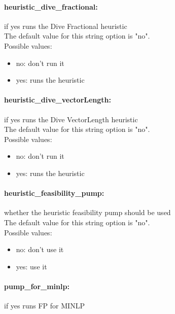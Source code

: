\paragraph{\bf heuristic\_dive\_fractional:}\label{sec:heuristic_dive_fractional} if yes runs the Dive Fractional heuristic $\;$ \\

The default value for this string option is "no".
\\ 
Possible values:
\begin{itemize}
   \item no: don't run it
   \item yes: runs the heuristic
\end{itemize}

\paragraph{\bf heuristic\_dive\_vectorLength:}\label{sec:heuristic_dive_vectorLength} if yes runs the Dive VectorLength heuristic $\;$ \\

The default value for this string option is "no".
\\ 
Possible values:
\begin{itemize}
   \item no: don't run it
   \item yes: runs the heuristic
\end{itemize}

\paragraph{\bf heuristic\_feasibility\_pump:}\label{sec:heuristic_feasibility_pump} whether the heuristic feasibility pump should be used $\;$ \\

The default value for this string option is "no".
\\ 
Possible values:
\begin{itemize}
   \item no: don't use it
   \item yes: use it
\end{itemize}

\paragraph{\bf pump\_for\_minlp:}\label{sec:pump_for_minlp} if yes runs FP for MINLP $\;$ \\


